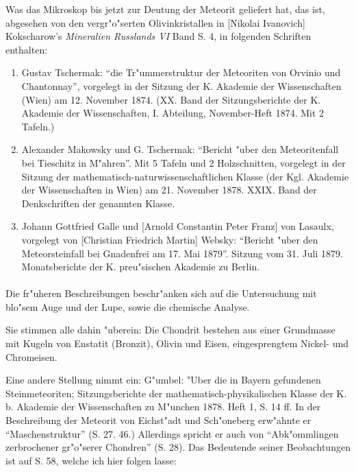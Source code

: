 \documentclass[a4paper, 11pt, oneside]{article}
\begin{document}
Was das Mikroskop bis jetzt zur Deutung der Meteorit geliefert hat, das ist, abgesehen von den vergr"o"serten Olivinkristallen in [Nikolai Ivanovich] Kokscharow's \emph{Mineralien Russlands VI} Band S. 4, in folgenden Schriften enthalten:
\large
\begin{enumerate}
\item Gustav Tschermak: "`die Tr"ummerstruktur der Meteoriten von Orvinio und Chantonnay"', vorgelegt in der Sitzung der K. Akademie der Wissenschaften (Wien) am 12. November 1874. (XX. Band der Sitzungsberichte der K. Akademie der Wissenschaften, I. Abteilung, November-Heft 1874. Mit 2 Tafeln.)
\item Alexander Makowsky und G. Tschermak: "`Bericht "uber den Meteoritenfall bei Tieschitz in M"ahren"'. Mit 5 Tafeln und 2 Holzschnitten, vorgelegt in der Sitzung der mathematisch-naturwissenschaftlichen Klasse (der Kgl. Akademie der Wissenschaften in Wien) am 21. November 1878. XXIX. Band der Denkschriften der genannten Klasse.
\item Johann Gottfried Galle und [Arnold Constantin Peter Franz] von Lasaulx, vorgelegt von [Christian Friedrich Martin] Websky: "`Bericht "uber den Meteorsteinfall bei Gnadenfrei am 17. Mai 1879"'. Sitzung vom 31. Juli 1879. Monatsberichte der K. preu"sischen Akademie zu Berlin.
\end{enumerate}
\LARGE
\paragraph{}
Die fr"uheren Beschreibungen beschr"anken sich auf die Untersuchung mit blo"sem Auge und der Lupe, sowie die chemische Analyse.

Sie stimmen alle dahin "uberein: Die Chondrit bestehen aus einer Grundmasse mit Kugeln von Enstatit (Bronzit), Olivin und Eisen, eingesprengtem Nickel- und Chromeisen.

Eine andere Stellung nimmt ein: G"umbel: "Uber die in Bayern gefundenen Steinmeteoriten; Sitzungsberichte der mathematisch-physikalischen Klasse der K. b. Akademie der Wissenschaften zu M"unchen 1878. Heft 1, S. 14 ff. In der Beschreibung der Meteorit von Eichst"adt und Sch"oneberg erw"ahnte er "`Maschenstruktur"' (S. 27. 46.) Allerdings spricht er auch von "`Abk"ommlingen zerbrochener gr"o"serer Chondren"' (S. 28). Das Bedeutende seiner Beobachtungen ist auf S. 58, welche ich hier folgen lasse:
\end{document}
